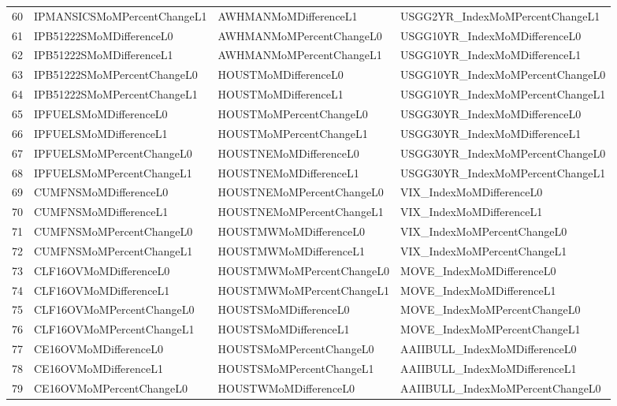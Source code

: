 \begin{longtable}{rlll}
  60 & IPMANSICSMoMPercentChangeL1 & AWHMANMoMDifferenceL1 & USGG2YR\_IndexMoMPercentChangeL1 \\ 
  61 & IPB51222SMoMDifferenceL0 & AWHMANMoMPercentChangeL0 & USGG10YR\_IndexMoMDifferenceL0 \\ 
  62 & IPB51222SMoMDifferenceL1 & AWHMANMoMPercentChangeL1 & USGG10YR\_IndexMoMDifferenceL1 \\ 
  63 & IPB51222SMoMPercentChangeL0 & HOUSTMoMDifferenceL0 & USGG10YR\_IndexMoMPercentChangeL0 \\ 
  64 & IPB51222SMoMPercentChangeL1 & HOUSTMoMDifferenceL1 & USGG10YR\_IndexMoMPercentChangeL1 \\ 
  65 & IPFUELSMoMDifferenceL0 & HOUSTMoMPercentChangeL0 & USGG30YR\_IndexMoMDifferenceL0 \\ 
  66 & IPFUELSMoMDifferenceL1 & HOUSTMoMPercentChangeL1 & USGG30YR\_IndexMoMDifferenceL1 \\ 
  67 & IPFUELSMoMPercentChangeL0 & HOUSTNEMoMDifferenceL0 & USGG30YR\_IndexMoMPercentChangeL0 \\ 
  68 & IPFUELSMoMPercentChangeL1 & HOUSTNEMoMDifferenceL1 & USGG30YR\_IndexMoMPercentChangeL1 \\ 
  69 & CUMFNSMoMDifferenceL0 & HOUSTNEMoMPercentChangeL0 & VIX\_IndexMoMDifferenceL0 \\ 
  70 & CUMFNSMoMDifferenceL1 & HOUSTNEMoMPercentChangeL1 & VIX\_IndexMoMDifferenceL1 \\ 
  71 & CUMFNSMoMPercentChangeL0 & HOUSTMWMoMDifferenceL0 & VIX\_IndexMoMPercentChangeL0 \\ 
  72 & CUMFNSMoMPercentChangeL1 & HOUSTMWMoMDifferenceL1 & VIX\_IndexMoMPercentChangeL1 \\ 
  73 & CLF16OVMoMDifferenceL0 & HOUSTMWMoMPercentChangeL0 & MOVE\_IndexMoMDifferenceL0 \\ 
  74 & CLF16OVMoMDifferenceL1 & HOUSTMWMoMPercentChangeL1 & MOVE\_IndexMoMDifferenceL1 \\ 
  75 & CLF16OVMoMPercentChangeL0 & HOUSTSMoMDifferenceL0 & MOVE\_IndexMoMPercentChangeL0 \\ 
  76 & CLF16OVMoMPercentChangeL1 & HOUSTSMoMDifferenceL1 & MOVE\_IndexMoMPercentChangeL1 \\ 
  77 & CE16OVMoMDifferenceL0 & HOUSTSMoMPercentChangeL0 & AAIIBULL\_IndexMoMDifferenceL0 \\ 
  78 & CE16OVMoMDifferenceL1 & HOUSTSMoMPercentChangeL1 & AAIIBULL\_IndexMoMDifferenceL1 \\ 
  79 & CE16OVMoMPercentChangeL0 & HOUSTWMoMDifferenceL0 & AAIIBULL\_IndexMoMPercentChangeL0 \\ 

\end{longtable}
